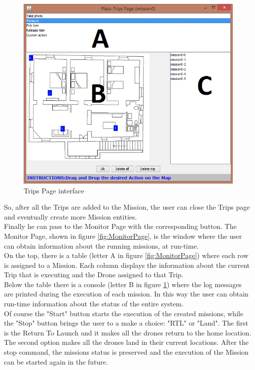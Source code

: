 \begin{figure}[H]
  \centering
  \includegraphics[width=\linewidth]{pictures/TripsPage.png}
  \caption{Trips Page interface}
  \label{fig:TripsPage}
\end{figure}

So, after all the Trips are added to the Mission, the user can close the Trips page and eventually create more Mission entities.
\\
Finally he can pass to the Monitor Page with the corresponding button.
The Monitor Page, shown in figure \ref{fig:MonitorPage}, is the window where the user can obtain information about the running missions, at run-time.
\\
On the top, there is a table (letter A in figure \ref{fig:MonitorPage}) where each row is assigned to a Mission.
Each column displays the information about the current Trip that is executing and the Drone assigned to that Trip.
\\
Below the table there is a console (letter B in figure \ref{fig:TripsPage}) where the log messages are printed during the execution of each mission.
In this way the user can obtain run-time information about the status of the entire system.
\\

Of course the "Start" button starts the execution of the created missions, while the "Stop" button brings the user to a make a choice: 
"RTL" or "Land".
The first is the Return To Launch and it makes all the drones return to the home location.
The second option makes all the drones land in their current locations. 
After the stop command, the missions status is preserved and the execution of the Mission can be started again in the future.

